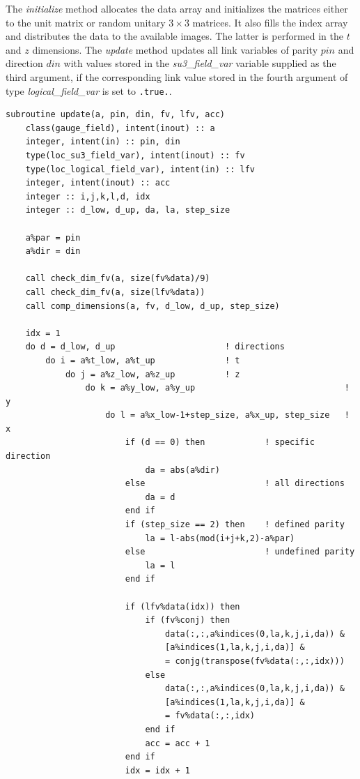 \documentclass[graybox]{svmult}
\begin{document}
The \emph{initialize} method allocates the data array and initializes the matrices either to the unit matrix or random unitary $3\times3$ matrices. It also fills the index array and distributes the data to the available
images. The latter is performed in the $t$ and $z$ dimensions.
The \emph{update} method updates all link variables of parity $pin$ and direction $din$ with values stored in the \emph{su3\_field\_var} variable supplied as the third argument, if the corresponding link value stored in the fourth argument of type \emph{logical\_field\_var} is set to \lstinline{.true.}{}.

\begin{lstlisting}[caption={Update subroutine of the \emph{gauge\_field} type. The subroutine \emph{comp\_dimensions} computes \emph{d\_low}, \emph{d\_up} and \emph{step\_size} from the values of the direction and parity flags}]
subroutine update(a, pin, din, fv, lfv, acc)
    class(gauge_field), intent(inout) :: a
    integer, intent(in) :: pin, din
    type(loc_su3_field_var), intent(inout) :: fv
    type(loc_logical_field_var), intent(in) :: lfv
    integer, intent(inout) :: acc
    integer :: i,j,k,l,d, idx
    integer :: d_low, d_up, da, la, step_size

    a%par = pin
    a%dir = din

    call check_dim_fv(a, size(fv%data)/9)
    call check_dim_fv(a, size(lfv%data))
    call comp_dimensions(a, fv, d_low, d_up, step_size)

    idx = 1
    do d = d_low, d_up              		! directions
        do i = a%t_low, a%t_up              ! t
            do j = a%z_low, a%z_up          ! z
                do k = a%y_low, a%y_up                 				! y
                    do l = a%x_low-1+step_size, a%x_up, step_size   ! x
                        if (d == 0) then    		! specific direction
                            da = abs(a%dir)
                        else                		! all directions
                            da = d
                        end if
                        if (step_size == 2) then    ! defined parity
                            la = l-abs(mod(i+j+k,2)-a%par)
                        else                        ! undefined parity
                            la = l
                        end if

                        if (lfv%data(idx)) then
                            if (fv%conj) then
                                data(:,:,a%indices(0,la,k,j,i,da)) &
                                [a%indices(1,la,k,j,i,da)] &
                                = conjg(transpose(fv%data(:,:,idx)))
                            else
                                data(:,:,a%indices(0,la,k,j,i,da)) &
                                [a%indices(1,la,k,j,i,da)] &
                                = fv%data(:,:,idx)
                            end if
                            acc = acc + 1
                        end if
                        idx = idx + 1


\end{lstlisting}
\end{document}
